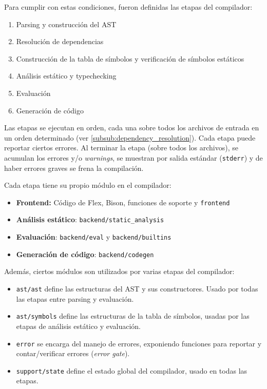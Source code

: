 Para cumplir con estas condiciones, fueron definidas las etapas del compilador:

\begin{enumerate}
	\item Parsing y construcción del AST
	\item Resolución de dependencias
	\item Construcción de la tabla de símbolos y verificación de símbolos estáticos
	\item Análisis estático y typechecking
	\item Evaluación
	\item Generación de código
\end{enumerate}

Las etapas se ejecutan en orden, cada una sobre todos los archivos de entrada en un orden determinado (ver \autoref{subsub:dependency_resolution}). Cada etapa puede reportar ciertos errores. Al terminar la etapa (sobre todos los archivos), se acumulan los errores y/o \textit{warnings}, se muestran por salida estándar (\texttt{stderr}) y de haber errores graves se frena la compilación.

Cada etapa tiene su propio módulo en el compilador:

\begin{itemize}
	\item \textbf{Frontend:} Código de Flex, Bison, funciones de soporte y \texttt{frontend}
	\item \textbf{Análisis estático}: \texttt{backend/static\_analysis}
	\item \textbf{Evaluación}: \texttt{backend/eval} y \texttt{backend/builtins}
	\item \textbf{Generación de código}: \texttt{backend/codegen}
\end{itemize}

Además, ciertos módulos son utilizados por varias etapas del compilador:

\begin{itemize}
	\item \texttt{ast/ast} define las estructuras del AST y sus constructores. Usado por todas las etapas entre parsing y evaluación.
	\item \texttt{ast/symbols} define las estructuras de la tabla de símbolos, usadas por las etapas de análisis estático y evaluación.
	\item \texttt{error} se encarga del manejo de errores, exponiendo funciones para reportar y contar/verificar errores (\textit{error gate}).
	\item \texttt{support/state} define el estado global del compilador, usado en todas las etapas.
\end{itemize}

